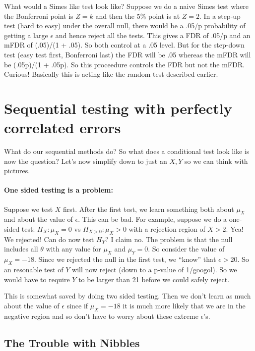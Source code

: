 \documentclass[14pt]{extarticle}
\begin{document}
What would a Simes like test look like?  Suppose we do a naive Simes
 test where the Bonferroni point is $Z = k$
 and then the 5\% point is at $Z=2$.  In a step-up test (hard to
easy) under the overall null, there would be a .05/p probability of
getting a large $\epsilon$ and hence reject all the tests.  This gives
a FDR of .05/p and an mFDR of (.05)/(1 + .05).  So both control at a
.05 level.  But for the step-down test (easy test first, Bonferroni
last) the FDR will be .05 whereas the mFDR will be (.05p)/(1 +
.05p).  So this proceedure controls the FDR but not the mFDR.
Curious!  Basically this is acting like the random test described
earlier. 

\section{Sequential testing with perfectly correlated errors}

What do our sequential methods do?  So what does a conditional test
 look like is now the question?  Let's now simplify down to just an
 $X, Y$ so we can think with pictures.

\paragraph{One sided testing is a problem:}  Suppose we test $X$ first.
  After the first test, we learn something both about $\mu_X$ and
about the value of $\epsilon$.  This can be bad.  For example, suppose
we do a one-sided test: $H_X: \mu_X = 0$ vs $H_{X>0}: \mu_X > 0$ with a
rejection region of $X > 2$.  Yea!  We rejected!  Can do now test
$H_Y$?  I claim no.  The problem is that the null includes all
$\theta$ with any value for $\mu_X$ and $\mu_Y = 0$.  So consider the
value of $\mu_X = -18$.  Since we rejected the null in the first test,
we ``know'' that $\epsilon > 20$.  So an resonable test of $Y$ will
now reject (down to a p-value of 1/googol).  So we would have to
require $Y$ to be larger than 21 before we could safely reject. 

This is somewhat saved by doing two sided testing.  Then we don't
learn as much about the value of $\epsilon$ since if $\mu_X = -18$ it
is much more likely that we are in the negative region and so don't
have to worry about these extreme $\epsilon$'s.

\subsection{The Trouble with Nibbles}
\end{document}
